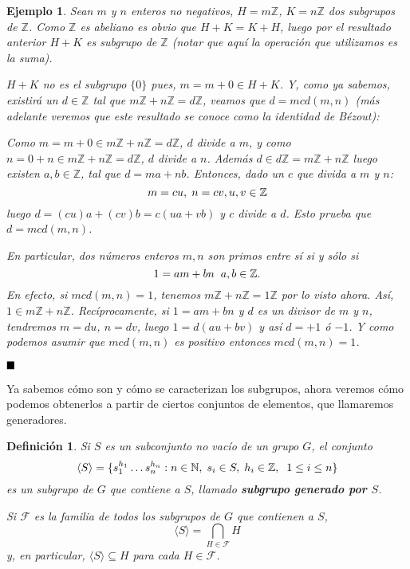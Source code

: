 \documentclass[12pt]{article}
\newtheorem{definition}[theorem]{Definición}
\newtheorem{example}{Ejemplo}[theorem]
\begin{document}
\begin{example}\label{eq:gib}Sean $m$ y $n$ enteros no negativos, $H = m\mathbb{Z}$, $K = n\mathbb{Z}$ dos subgrupos de $\mathbb{Z}$. Como $\mathbb{Z}$ es abeliano es obvio que $H+K = K+H$, luego por el resultado anterior $H+K$ es subgrupo de $\mathbb{Z}$ (notar que aquí la operación que utilizamos es la suma).


$H+K$ no es el subgrupo $\lbrace 0 \rbrace$ pues, $m = m + 0 \in H + K$. Y, como ya sabemos, existirá un $d \in \mathbb{Z}$ tal que $m\mathbb{Z}+n\mathbb{Z} = d\mathbb{Z}$, veamos que $d = mcd(m,n)$ (más adelante veremos que este resultado se conoce como la identidad de Bézout):

Como $m = m + 0 \in m\mathbb{Z}+n\mathbb{Z} = d\mathbb{Z}$, $d$ divide a $m$, y como $n = 0 + n \in m\mathbb{Z}+n\mathbb{Z} = d\mathbb{Z}$, $d$ divide a $n$. Además $d \in d\mathbb{Z} = m\mathbb{Z} + n\mathbb{Z}$ luego existen $a,b \in \mathbb{Z}$, tal que $d = ma + nb$. Entonces, dado un $c$ que divida a $m$ y $n$:
$$m = cu,\hspace{0.1cm} n = cv, u, v \in \mathbb{Z}$$ luego $d = (cu)a + (cv)b = c(ua + vb)$ y $c$ divide a $d$. Esto prueba que $d = mcd(m,n)$. 

En particular, dos números enteros $m,n$ son primos entre sí si y sólo si $$1 = am + bn \hspace{0.2cm} a,b \in \mathbb{Z}.$$ En efecto, si $mcd(m,n) = 1$, tenemos $m\mathbb{Z} + n\mathbb{Z} = 1\mathbb{Z}$ por lo visto ahora. Así, $1 \in m\mathbb{Z}+n\mathbb{Z}$. Recíprocamente, si $1 = am + bn$ y $d$ es un divisor de $m$ y $n$, tendremos $m = du$, $n = dv$, luego $1 = d(au + bv)$ y así $d = +1$ ó $-1$. Y como podemos asumir que $mcd(m,n)$ es positivo entonces $mcd(m,n) = 1$.
\end{example}

$\hfill \blacksquare$

Ya sabemos cómo son y cómo se caracterizan los subgrupos, ahora veremos cómo podemos obtenerlos a partir de ciertos conjuntos de elementos, que llamaremos generadores.

\begin{definition}Si $S$ es un subconjunto no vacío de un grupo $G$, el conjunto $$\langle S \rangle = \lbrace s_{1}^{h_{1}} \ldots s_{n}^{h_{n}} : n \in \mathbb{N},\hspace{0.1cm} s_{i} \in S,\hspace{0.1cm} h_{i} \in \mathbb{Z}, \hspace{0.2cm} 1 \leq i \leq n \rbrace$$ es un subgrupo de $G$ que contiene a $S$, llamado \textbf{subgrupo generado por $S$}.


Si $\mathcal{F}$ es la familia de todos los subgrupos de $G$ que contienen a $S$, $$ \langle S \rangle = \bigcap_{H \in \mathcal{F}} H$$ y, en particular, $\langle S\rangle \subseteq H$ para cada $H \in \mathcal{F}$.
\end{definition}
\end{document}
